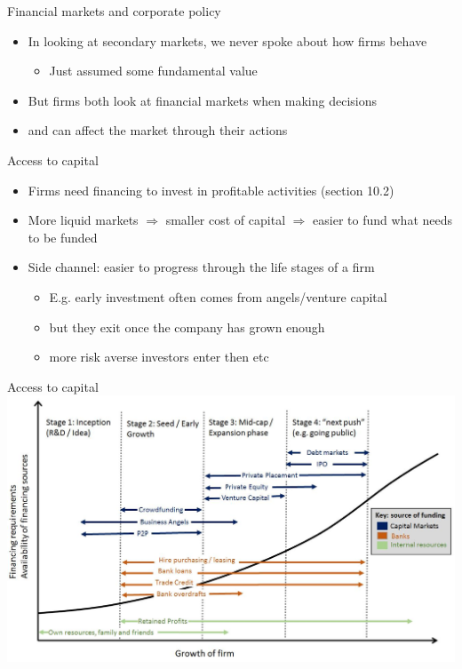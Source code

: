 \documentclass[english,10pt
,aspectratio=169
]{beamer}
\begin{document}
\begin{frame}{Financial markets and corporate policy}
	\begin{itemize}
		\item In looking at secondary markets, we never spoke about how firms behave
		\begin{itemize}
			\item Just assumed some fundamental value
		\end{itemize}
		\item But firms both look at financial markets when making decisions
		\item and can affect the market through their actions
	\end{itemize}
\end{frame}


\begin{frame}{Access to capital}
	\begin{itemize}
		\item Firms need financing to invest in profitable activities (section 10.2)
		\item More liquid markets $\Rightarrow$ smaller cost of capital $\Rightarrow$ easier to fund what needs to be funded
		\item Side channel: easier to progress through the life stages of a firm
		\begin{itemize}
			\item E.g. early investment often comes from angels/venture capital
			\item but they exit once the company has grown enough
			\item more risk averse investors enter then etc
		\end{itemize}
	\end{itemize}
\end{frame}


\begin{frame}{Access to capital}
	\centering
	\includegraphics[width=.7\paperwidth]{pics/funding}
\end{frame}
\end{document}
